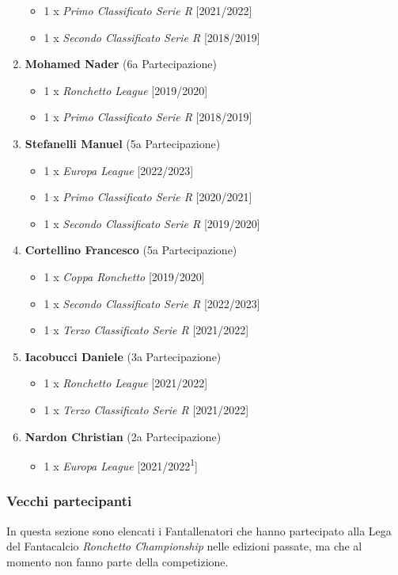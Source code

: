 \documentclass[12pt]{article}
\begin{document}
\begin{enumerate}
\begin{itemize}
        \item 1 x \textit{Primo Classificato Serie R} [2021/2022]
        \item 1 x \textit{Secondo Classificato Serie R} [2018/2019]
    \end{itemize}
    \item \textbf{Mohamed Nader} (6a Partecipazione)
    \begin{itemize}
        \item 1 x \textit{Ronchetto League} [2019/2020]
        \item 1 x \textit{Primo Classificato Serie R} [2018/2019]
    \end{itemize}
    \item \textbf{Stefanelli Manuel} (5a Partecipazione)
    \begin{itemize}
        \item 1 x \textit{Europa League} [2022/2023]
        \item 1 x \textit{Primo Classificato Serie R} [2020/2021]
        \item 1 x \textit{Secondo Classificato Serie R} [2019/2020]
    \end{itemize}
    \item \textbf{Cortellino Francesco} (5a Partecipazione)
    \begin{itemize}
        \item 1 x \textit{Coppa Ronchetto} [2019/2020]
        \item 1 x \textit{Secondo Classificato Serie R} [2022/2023]
        \item 1 x \textit{Terzo Classificato Serie R} [2021/2022]
    \end{itemize}
    \item \textbf{Iacobucci Daniele} (3a Partecipazione)
    \begin{itemize}
        \item 1 x \textit{Ronchetto League} [2021/2022]
        \item 1 x \textit{Terzo Classificato Serie R} [2021/2022]
    \end{itemize}
    \item \textbf{Nardon Christian} (2a Partecipazione)
    \begin{itemize}
        \item 1 x \textit{Europa League} [2021/2022\textsuperscript{1}]
    \end{itemize}
\end{enumerate}

\subsubsection*{Vecchi partecipanti}
In questa sezione sono elencati i Fantallenatori che hanno partecipato alla Lega del Fantacalcio \textit{Ronchetto Championship} nelle edizioni passate, ma che al momento non fanno parte della competizione. 
\end{document}

